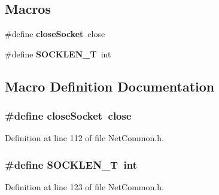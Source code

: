 \subsection*{Macros}
\begin{DoxyCompactItemize}
\item 
\#define {\bf close\+Socket}~close
\item 
\#define {\bf S\+O\+C\+K\+L\+E\+N\+\_\+\+T}~int
\end{DoxyCompactItemize}


\subsection{Macro Definition Documentation}
\subsubsection[{close\+Socket}]{\setlength{\rightskip}{0pt plus 5cm}\#define close\+Socket~close}\label{NetCommon_8h_a6b429e60e938002ac84c189c027b36f5}


Definition at line 112 of file Net\+Common.\+h.

\subsubsection[{S\+O\+C\+K\+L\+E\+N\+\_\+\+T}]{\setlength{\rightskip}{0pt plus 5cm}\#define S\+O\+C\+K\+L\+E\+N\+\_\+\+T~int}\label{NetCommon_8h_a7687159c87b8758364782b0b3f00215a}


Definition at line 123 of file Net\+Common.\+h.

